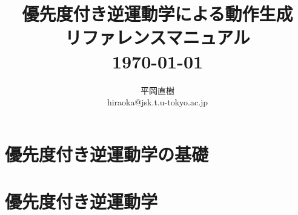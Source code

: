 \documentclass[]{jarticle}
\begin{document}
\newenvironment{refdesc}{
 \vspace{5mm} \parindent=0mm \topsep=0mm \parskip=0mm \leftmargin=10mm}{
             \parindent=10mm \topsep=3mm \parskip=1mm \leftmargin=0mm }


\date{}
\title{{\LARGE \bf 優先度付き逆運動学による動作生成 \\ リファレンスマニュアル} \\
\vspace{10mm}
{\large \today} \\
}

\author{
平岡直樹 \\
hiraoka@jsk.t.u-tokyo.ac.jp \\
}

\thispagestyle{empty}
\maketitle
{}
\tableofcontents

\newpage
{}

\section{優先度付き逆運動学の基礎} \label{chap:fundamental}


\section{優先度付き逆運動学} \label{chap:prioritized-inverse-kinematics}



\end{document}
